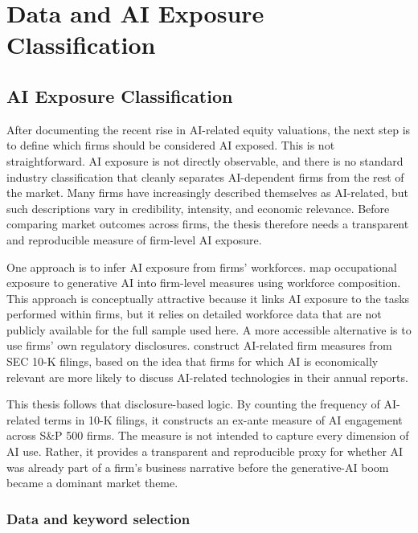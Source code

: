\chapter{Data and AI Exposure Classification}
\label{ch:data}

\section{AI Exposure Classification}
\label{sec:ai-exposure-classification}

After documenting the recent rise in AI-related equity valuations, the next step is to define which firms should be considered AI exposed. This is not straightforward. AI exposure is not directly observable, and there is no standard industry classification that cleanly separates AI-dependent firms from the rest of the market. Many firms have increasingly described themselves as AI-related, but such descriptions vary in credibility, intensity, and economic relevance. Before comparing market outcomes across firms, the thesis therefore needs a transparent and reproducible measure of firm-level AI exposure.

One approach is to infer AI exposure from firms' workforces. \citet{eisfeldtSchubertZhangTaska2023} map occupational exposure to generative AI into firm-level measures using workforce composition. This approach is conceptually attractive because it links AI exposure to the tasks performed within firms, but it relies on detailed workforce data that are not publicly available for the full sample used here. A more accessible alternative is to use firms' own regulatory disclosures. \citet{anteSaggu2025} construct AI-related firm measures from SEC 10-K filings, based on the idea that firms for which AI is economically relevant are more likely to discuss AI-related technologies in their annual reports.

This thesis follows that disclosure-based logic. By counting the frequency of AI-related terms in 10-K filings, it constructs an ex-ante measure of AI engagement across S\&P 500 firms. The measure is not intended to capture every dimension of AI use. Rather, it provides a transparent and reproducible proxy for whether AI was already part of a firm's business narrative before the generative-AI boom became a dominant market theme.

\subsection{Data and keyword selection}
\label{subsec:data-keyword-selection}

